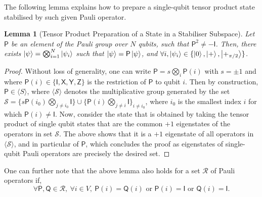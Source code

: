 \documentclass[12pt]{iopart}
\newcommand{\cptp}[1]{\mathsf{#1}} \newcommand{\pd}[1]{\mathcal{#1}}  \newcommand{\sch}[1]{\bm{#1}}
\newcommand{\Id}{\cptp{I}}
\newcommand{\X}{\cptp{X}}
\newcommand{\Z}{\cptp{Z}}
\newcommand{\Y}{\cptp{Y}}
\renewcommand{\1}{\mathds{1}}
\newtheorem{lemma}{Lemma}
\begin{document}
The following lemma explains how to prepare a single-qubit tensor
product state stabilised by such given Pauli operator.
\begin{lemma}[Tensor Product Preparation of a State in a Stabiliser Subspace]\label{lem:prep}
 Let $\cptp P$ be an element of the Pauli group over $N$ qubits, such
 that $\cptp P^2 \neq -\Id$. Then, there exists $\ket \psi
 = \bigotimes_{i=1}^N \ket{\psi_i}$ such that $\ket \psi = \cptp
 P \ket \psi$, and $\forall
 i, \ket{\psi_i} \in \{\ket{0}, \ket{+}, \ket{+_{\pi/2}}\}$.
\end{lemma}

\begin{proof}
 Without loss of generality, one can write $\cptp P =
 s \bigotimes_i \cptp P(i)$ with $s= \pm 1$ and where $\cptp
 P(i) \in \{\Id, \X, \Y, \Z\}$ is the restriction of $\cptp P$ to
 qubit $i$. Then by construction, $\cptp P \in \langle S \rangle$,
 where $\langle \mathcal S \rangle$ denotes the multiplicative group generated
 by the set $\mathcal S = \{s\cptp P(i_0) \bigotimes_{j\neq
 i_0} \Id\} \cup \{\cptp P(i) \bigotimes_{j\neq i} \Id \}_{i\neq
 i_0}$, where $i_0$ is the smallest index $i$ for which
 $\cptp P(i) \neq \Id$. Now, consider the state that is obtained by taking
 the tensor product of single qubit states that are the common $+1$
 eigenstates of the operators in set $\mathcal S$. The above shows that it is
 a $+1$ eigenstate of all operators in $\langle \mathcal S \rangle$, and in
 particular of $\cptp P$, which concludes the proof as eigenstates of
 single-qubit Pauli operators are precisely the desired set.
\end{proof}
One can further note that the above lemma also holds for a set $\mathcal R$ of
Pauli operators if,
\begin{equation}
\label{eq:overlap}
\forall \cptp P, \cptp Q \in \mathcal R, \ \forall i \in V, \ \cptp P(i) = \cptp Q(i) \mbox{ or } \cptp P(i) = \Id \mbox{ or } \cptp Q(i) = \Id.
\end{equation}
\end{document}
